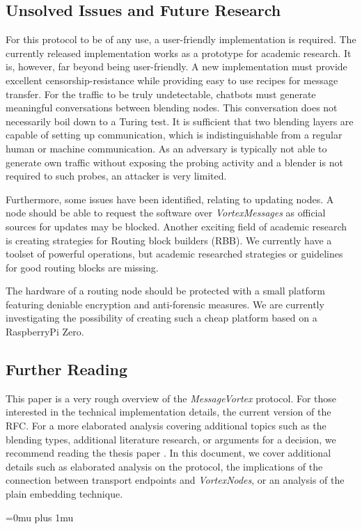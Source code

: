 \documentclass[acmsmall, screen, final]{acmart}
\begin{document}
	\subsection{Unsolved Issues and Future Research}
	For this protocol to be of any use, a user-friendly implementation is required. The currently released implementation works as a prototype for academic research. It is, however, far beyond being user-friendly. A new implementation must provide excellent censorship-resistance while providing easy to use recipes for message transfer.  For the traffic to be truly undetectable, chatbots must generate meaningful conversations between blending nodes. This conversation does not necessarily boil down to a Turing test. It is sufficient that two blending layers are capable of setting up communication, which is indistinguishable from a regular human or machine communication. As an adversary is typically not able to generate own traffic without exposing the probing activity and a blender is not required to such probes, an attacker is very limited. 
	
	Furthermore, some issues have been identified, relating to updating nodes. A node should be able to request the software over \emph{VortexMessages} as official sources for updates may be blocked. Another exciting field of academic research is creating strategies for Routing block builders (RBB). We currently have a toolset of powerful operations, but academic researched strategies or guidelines for good routing blocks are missing. 
	
	The hardware of a routing node should be protected with a small platform featuring deniable encryption and anti-forensic measures. We are currently investigating the possibility of creating such a cheap platform based on a RaspberryPi Zero. 
	
	\subsection{Further Reading}
	This paper is a very rough overview of the \emph{MessageVortex} protocol. For those interested in the technical implementation details, the current version of the RFC\cite{MessageVortexRFC}. For a more elaborated analysis covering additional topics such as the blending types, additional literature research, or arguments for a decision, we recommend reading the thesis paper \cite{messageVortex}. In this document, we cover additional details such as elaborated analysis on the protocol, the implications of the connection between transport endpoints and \emph{VortexNodes}, or an analysis of the plain embedding technique.
	
	
	
	\Urlmuskip=0mu plus 1mu %
	
	
\end{document}
